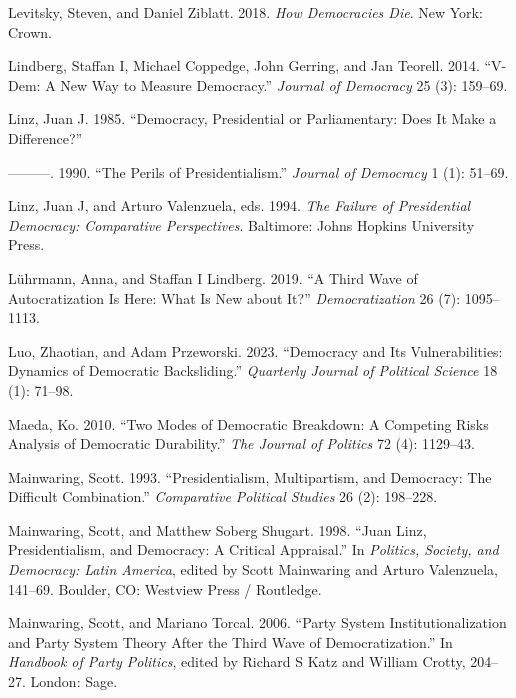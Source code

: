 \documentclass[
  letterpaper,
  DIV=11,
  numbers=noendperiod]{scrartcl}
\newlength{\cslhangindent}
\newenvironment{CSLReferences}[2] %
 {\begin{list}{}{%
  \setlength{\itemindent}{0pt}
  \setlength{\leftmargin}{0pt}
  \setlength{\parsep}{0pt}
  \ifodd #1
   \setlength{\leftmargin}{\cslhangindent}
   \setlength{\itemindent}{-1\cslhangindent}
  \fi
  \setlength{\itemsep}{#2\baselineskip}}}
 {\end{list}}
\begin{document}
\begin{CSLReferences}{1}{0}
Levitsky, Steven, and Daniel Ziblatt. 2018. \emph{How Democracies Die}.
New York: Crown.

Lindberg, Staffan I, Michael Coppedge, John Gerring, and Jan Teorell.
2014. {``V-Dem: A New Way to Measure Democracy.''} \emph{Journal of
Democracy} 25 (3): 159--69.

Linz, Juan J. 1985. {``Democracy, Presidential or Parliamentary: Does It
Make a Difference?''}

---------. 1990. {``The Perils of Presidentialism.''} \emph{Journal of
Democracy} 1 (1): 51--69.

Linz, Juan J, and Arturo Valenzuela, eds. 1994. \emph{The Failure of
Presidential Democracy: Comparative Perspectives}. Baltimore: Johns
Hopkins University Press.

Lührmann, Anna, and Staffan I Lindberg. 2019. {``A Third Wave of
Autocratization Is Here: What Is New about It?''} \emph{Democratization}
26 (7): 1095--1113.

Luo, Zhaotian, and Adam Przeworski. 2023. {``Democracy and Its
Vulnerabilities: Dynamics of Democratic Backsliding.''} \emph{Quarterly
Journal of Political Science} 18 (1): 71--98.

Maeda, Ko. 2010. {``Two Modes of Democratic Breakdown: A Competing Risks
Analysis of Democratic Durability.''} \emph{The Journal of Politics} 72
(4): 1129--43.

Mainwaring, Scott. 1993. {``Presidentialism, Multipartism, and
Democracy: The Difficult Combination.''} \emph{Comparative Political
Studies} 26 (2): 198--228.

Mainwaring, Scott, and Matthew Soberg Shugart. 1998. {``Juan Linz,
Presidentialism, and Democracy: A Critical Appraisal.''} In
\emph{Politics, Society, and Democracy: Latin America}, edited by Scott
Mainwaring and Arturo Valenzuela, 141--69. Boulder, CO: Westview Press /
Routledge.

Mainwaring, Scott, and Mariano Torcal. 2006. {``Party System
Institutionalization and Party System Theory After the Third Wave of
Democratization.''} In \emph{Handbook of Party Politics}, edited by
Richard S Katz and William Crotty, 204--27. London: Sage.


\end{CSLReferences}
\end{document}

